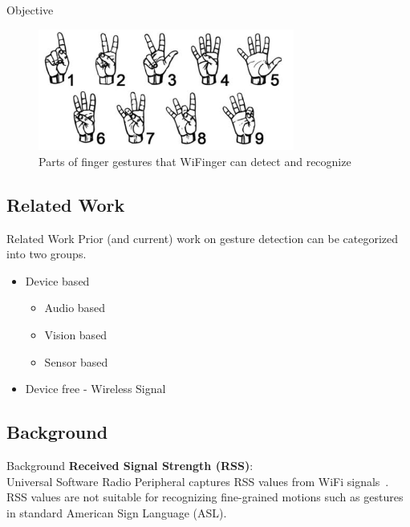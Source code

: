 \documentclass{beamer}
\begin{document}
\begin{frame}{Objective}
	\begin{center}
		\begin{figure}
			\includegraphics[width=0.75\textwidth]{Images/asl.png}
			\caption{Parts of finger gestures that WiFinger can detect and recognize~\cite{li2016wifinger}}
		\end{figure}
     \end{center}
\end{frame}

\subsection{Related Work}
\begin{frame}{Related Work}
Prior (and current) work on gesture detection can be categorized into two groups.
\begin{itemize}
	\item Device based
		\begin{itemize}
			\item Audio based
			\item Vision based
			\item Sensor based
		\end{itemize}
	\item Device free - Wireless Signal
\end{itemize}

\end{frame}

\subsection{Background}
\begin{frame}{Background}
\textbf{Received Signal Strength (RSS)}:\\
Universal Software Radio Peripheral captures RSS values from WiFi signals~\cite{sigg2013leveraging, sigg2013rf}. RSS values are not suitable for recognizing fine-grained motions such as gestures in standard American Sign Language (ASL).
\end{frame}
\end{document}
